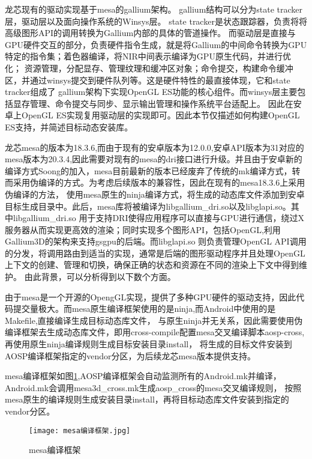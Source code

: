 龙芯现有的驱动实现基于mesa的gallium架构。
gallium结构可以分为state tracker层，驱动层以及面向操作系统的Winsys层。
state tracker是状态跟踪器，负责将将高级图形API的调用转换为Gallium内部的具体的管道操作。
而驱动层是直接与GPU硬件交互的部分，负责硬件指令生成，就是将Gallium的中间命令转换为GPU特定的指令集；着色器编译，将NIR中间表示编译为GPU原生代码，并进行优化；
资源管理，分配显存、管理纹理和缓冲区对象；命令提交，构建命令缓冲区，并通过winsys提交到硬件队列等。这是硬件特性的最直接体现，它和state tracker组成了
gallium架构下实现OpenGL ES功能的核心组件。而winsys层主要包括显存管理、命令提交与同步、显示输出管理和操作系统平台适配上。
因此在安卓上OpenGL ES实现复用驱动层的实现即可。因此本节仅描述如何构建OpenGL ES支持，并简述目标动态安装库。

龙芯mesa的版本为18.3.6,而由于现有的安卓版本为12.0.0,安卓API版本为31对应的mesa版本为20.3.4,因此需要对现有的mesa的dri接口进行升级。并且由于安卓新的
编译方式Soong的加入，mesa目前最新的版本已经废弃了传统的mk编译方式，转而采用伪编译的方式。为考虑后续版本的兼容性，因此在现有的mesa18.3.6上采用伪编译的方法，
使用mesa原生的ninja编译方式，将生成的动态库文件添加到安卓目标生成目录中。此后，mesa库将被编译为libgallium\_dri.so以及libglapi.so。其中libgallium\_dri.so
用于支持DRI使得应用程序可以直接与GPU进行通信，绕过X服务器从而实现更高效的渲染；同时实现多个图形API，包括OpenGL,利用Gallium3D的架构来支持gsgpu的后端。而libglapi.so
则负责管理OpenGL API调用的分发，将调用路由到适当的实现，通常是后端的图形驱动程序并且处理OpenGL上下文的创建、管理和切换，确保正确的状态和资源在不同的渲染上下文中得到维护。
由此背景，可以分析得到以下数个方面。

由于mesa是一个开源的OpengGL实现，提供了多种GPU硬件的驱动支持，因此代码提交量极大。而mesa原生编译框架使用的是ninja,而Android中使用的是Makefile,直接编译生成目标动态库文件，
与原生ninja并无关系，因此需要使用伪编译框架去生成动态库文件，即用cross-compile配置mesa交叉编译脚本aosp-cross,再使用原生ninja编译规则生成目标安装目录install，
将生成的目标文件安装到AOSP编译框架指定的vendor分区，为后续龙芯mesa版本提供支持。

mesa编译框架如图\ref{fig:mesa编译框架},AOSP编译框架会自动监测所有的Android.mk并编译，Android.mk会调用mesa3d\_cross.mk生成aosp\_cross的mesa交叉编译规则，
按照mesa原生的编译规则生成安装目录install，再将目标动态库文件安装到指定的vendor分区。
\begin{figure}[h]
  \centering
  \texttt{[image: mesa编译框架.jpg]}
  \caption{mesa编译框架}
  \label{fig:mesa编译框架}
\end{figure}

